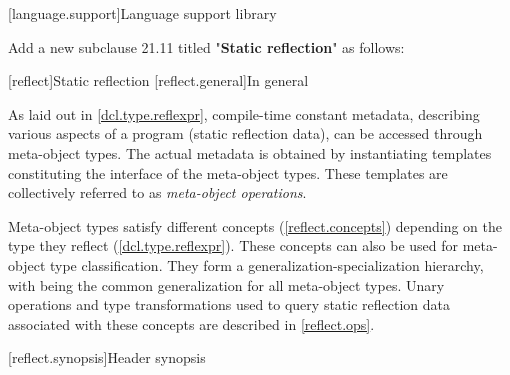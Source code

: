 
[language.support]{Language support library}

Add a new subclause 21.11 titled "\textbf{Static reflection}" as follows:

\setcounter{section}{10}

[reflect]{Static reflection}
[reflect.general]{In general}

\begin{std.txt}\color{addclr}

As laid out in \ref{dcl.type.reflexpr}, compile-time constant metadata,
describing various aspects of a program (static reflection data), can be
accessed through meta-object types.  The actual metadata is obtained by
instantiating templates constituting the interface of the meta-object types.
These templates are collectively referred to as \emph{meta-object operations}.

Meta-object types satisfy different concepts (\ref{reflect.concepts}) depending on the type
they reflect (\ref{dcl.type.reflexpr}).  These concepts can also be used for
meta-object type classification.  They form a generalization-specialization
hierarchy, with  being the common generalization for all
meta-object types.  Unary operations and type transformations used to query
static reflection data associated with these concepts are described in
\ref{reflect.ops}.
  
\end{std.txt}

[reflect.synopsis]{Header  synopsis}

